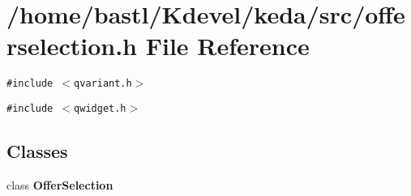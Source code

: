 \section{/home/bastl/Kdevel/keda/src/offerselection.h File Reference}
\label{offerselection_8h}
{\tt \#include $<$qvariant.h$>$}\par
{\tt \#include $<$qwidget.h$>$}\par
\subsection*{Classes}
\begin{CompactItemize}
\item 
class {\bf Offer\-Selection}
\end{CompactItemize}
